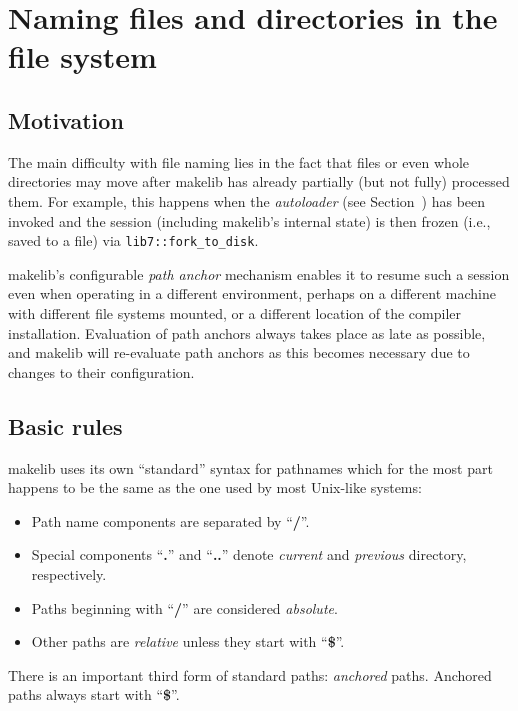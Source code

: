 
\section{Naming files and directories in the file system}

\subsection{Motivation}

The main difficulty with file naming lies in the fact that files or
even whole directories may move after makelib has already partially (but
not fully) processed them.  For example, this happens when the {\em
autoloader} (see Section~) has been invoked and the
session (including makelib's internal state) is then frozen (i.e., saved to
a file) via {\tt lib7::fork_to_disk}.

makelib's configurable {\em path anchor} mechanism enables it to resume
such a session even when operating in a different environment, perhaps
on a different machine with different file systems mounted, or a
different location of the compiler installation.  Evaluation of path
anchors always takes place as late as possible, and makelib will re-evaluate
path anchors as this becomes necessary due to changes to their
configuration.

\subsection{Basic rules}
\label{sec:basicrules}

makelib uses its own ``standard'' syntax for pathnames which for the most
part happens to be the same as the one used by most Unix-like systems:
\begin{itemize}
\item Path name components are separated by ``{\bf /}''.
\item Special components ``{\bf .}'' and ``{\bf ..}'' denote {\em
current} and {\em previous} directory, respectively.
\item Paths beginning
with ``{\bf /}'' are considered {\em absolute}.
\item Other paths are {\em relative} unless they start with ``{\bf \$}''.
\end{itemize}
\noindent There is an important third form of standard paths: {\em
anchored} paths.  Anchored paths always start with ``{\bf \$}''.

